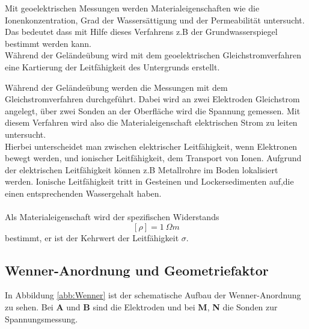 






Mit geoelektrischen Messungen werden Materialeigenschaften wie die Ionenkonzentration, Grad der Wassersättigung und der Permeabilität untersucht. 
Das bedeutet dass mit Hilfe dieses Verfahrens z.B der Grundwasserspiegel bestimmt werden kann. \\
Während der Geländeübung wird mit dem geoelektrischen Gleichstromverfahren eine Kartierung der Leitfähigkeit des Untergrunds erstellt.


Während der Geländeübung werden die Messungen mit dem Gleichstromverfahren durchgeführt. Dabei wird an zwei Elektroden Gleichstrom angelegt,
über zwei Sonden an der Oberfläche wird die Spannung gemessen. Mit diesem Verfahren wird also die Materialeigenschaft elektrischen Strom zu leiten untersucht. \\
Hierbei unterscheidet man zwischen elektrischer Leitfähigkeit, wenn Elektronen bewegt werden, und ionischer Leitfähigkeit, dem Transport von Ionen. 
Aufgrund der elektrischen Leitfähigkeit können z.B Metallrohre im Boden lokalisiert werden. Ionische Leitfähigkeit tritt in Gesteinen und Lockersedimenten auf,die einen entsprechenden Wassergehalt haben. \\
\\
Als Materialeigenschaft wird der spezifischen Widerstands $$[\rho] = \SI{1}{\Omega m}$$ bestimmt, er ist der Kehrwert der Leitfähigkeit $\sigma$.

\subsection{Wenner-Anordnung und Geometriefaktor}
In Abbildung \ref{abb:Wenner} ist der schematische Aufbau der Wenner-Anordnung zu sehen. Bei \textbf{A} und \textbf{B} sind die Elektroden und bei \textbf{M}, \textbf{N} die Sonden zur Spannungsmessung.


